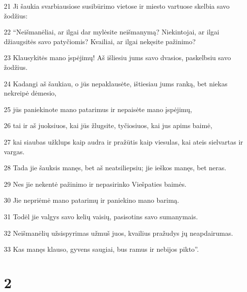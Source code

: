 \par 21 Ji šaukia svarbiausiose susibūrimo vietose ir miesto vartuose skelbia savo žodžius: 
\par 22 “Neišmanėliai, ar ilgai dar mylėsite neišmanymą? Niekintojai, ar ilgai džiaugsitės savo patyčiomis? Kvailiai, ar ilgai nekęsite pažinimo? 
\par 23 Klausykitės mano įspėjimų! Aš išliesiu jums savo dvasios, paskelbsiu savo žodžius. 
\par 24 Kadangi aš šaukiau, o jūs nepaklausėte, ištiesiau jums ranką, bet niekas nekreipė dėmesio, 
\par 25 jūs paniekinote mano patarimus ir nepaisėte mano įspėjimų, 
\par 26 tai ir aš juoksiuos, kai jūs žlugsite, tyčiosiuos, kai jus apims baimė, 
\par 27 kai siaubas užklups kaip audra ir pražūtis kaip viesulas, kai ateis sielvartas ir vargas. 
\par 28 Tada jie šauksis manęs, bet aš neatsiliepsiu; jie ieškos manęs, bet neras. 
\par 29 Nes jie nekentė pažinimo ir nepasirinko Viešpaties baimės. 
\par 30 Jie nepriėmė mano patarimų ir paniekino mano barimą. 
\par 31 Todėl jie valgys savo kelių vaisių, pasisotins savo sumanymais. 
\par 32 Neišmanėlių užsispyrimas užmuš juos, kvailius pražudys jų neapdairumas. 
\par 33 Kas manęs klauso, gyvens saugiai, bus ramus ir nebijos pikto”.


\chapter{2}


